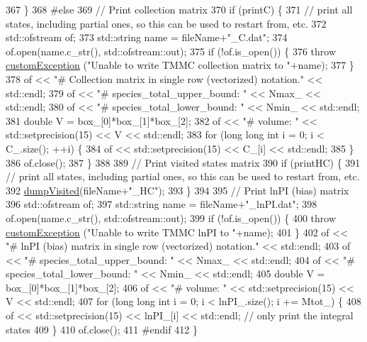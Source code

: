 \begin{DoxyCode}
367     \}
368 \textcolor{preprocessor}{#else}
369 \textcolor{preprocessor}{}    \textcolor{comment}{// Print collection matrix}
370     \textcolor{keywordflow}{if} (printC) \{
371         \textcolor{comment}{// print all states, including partial ones, so this can be used to restart from, etc.}
372         std::ofstream of;
373         std::string name = fileName+\textcolor{stringliteral}{"\_C.dat"};
374         of.open(name.c\_str(), std::ofstream::out);
375         \textcolor{keywordflow}{if} (!of.is\_open()) \{
376             \textcolor{keywordflow}{throw} \hyperlink{classcustom_exception}{customException} (\textcolor{stringliteral}{"Unable to write TMMC collection matrix to "}+name);
377         \}
378         of << \textcolor{stringliteral}{"# Collection matrix in single row (vectorized) notation."} << std::endl;
379         of << \textcolor{stringliteral}{"# species\_total\_upper\_bound: "} << Nmax\_ << std::endl;
380         of << \textcolor{stringliteral}{"# species\_total\_lower\_bound: "} << Nmin\_ << std::endl;
381         \textcolor{keywordtype}{double} V = box\_[0]*box\_[1]*box\_[2];
382         of << \textcolor{stringliteral}{"# volume: "} << std::setprecision(15) << V << std::endl;
383         \textcolor{keywordflow}{for} (\textcolor{keywordtype}{long} \textcolor{keywordtype}{long} \textcolor{keywordtype}{int} i = 0; i < C\_.size(); ++i) \{
384             of << std::setprecision(15) << C\_[i] << std::endl;
385         \}
386         of.close();
387     \}
388 
389     \textcolor{comment}{// Print visited states matrix}
390     \textcolor{keywordflow}{if} (printHC) \{
391         \textcolor{comment}{// print all states, including partial ones, so this can be used to restart from, etc.}
392         \hyperlink{classtmmc_a295886d2f7a947a9de890bcb3adb51c7}{dumpVisited}(fileName+\textcolor{stringliteral}{"\_HC"});
393     \}
394 
395     \textcolor{comment}{// Print lnPI (bias) matrix}
396     std::ofstream of;
397     std::string name = fileName+\textcolor{stringliteral}{"\_lnPI.dat"};
398     of.open(name.c\_str(), std::ofstream::out);
399     \textcolor{keywordflow}{if} (!of.is\_open()) \{
400         \textcolor{keywordflow}{throw} \hyperlink{classcustom_exception}{customException} (\textcolor{stringliteral}{"Unable to write TMMC lnPI to "}+name);
401     \}
402     of << \textcolor{stringliteral}{"# lnPI (bias) matrix in single row (vectorized) notation."} << std::endl;
403     of << \textcolor{stringliteral}{"# species\_total\_upper\_bound: "} << Nmax\_ << std::endl;
404     of << \textcolor{stringliteral}{"# species\_total\_lower\_bound: "} << Nmin\_ << std::endl;
405     \textcolor{keywordtype}{double} V = box\_[0]*box\_[1]*box\_[2];
406     of << \textcolor{stringliteral}{"# volume: "} << std::setprecision(15) << V << std::endl;
407     \textcolor{keywordflow}{for} (\textcolor{keywordtype}{long} \textcolor{keywordtype}{long} \textcolor{keywordtype}{int} i = 0; i < lnPI\_.size(); i += Mtot\_) \{
408         of << std::setprecision(15) << lnPI\_[i] << std::endl; \textcolor{comment}{// only print the integral states}
409     \}
410     of.close();
411 \textcolor{preprocessor}{#endif}
412 \textcolor{preprocessor}{}\}
\end{DoxyCode}
